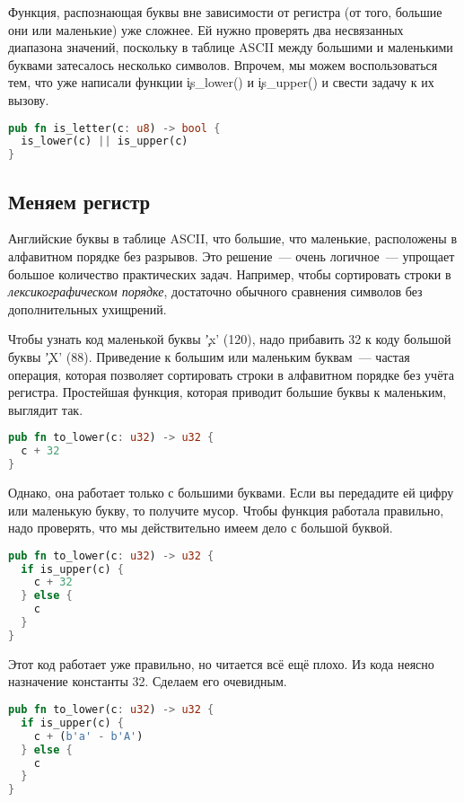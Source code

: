 Функция, распознающая буквы вне зависимости от регистра (от того, большие они или маленькие) уже сложнее.
Ей нужно проверять два несвязанных диапазона значений, поскольку в таблице ASCII между большими и маленькими буквами затесалось несколько символов.
Впрочем, мы можем воспользоваться тем, что уже написали функции \c{is\_lower()} и \c{is\_upper()} и свести задачу к их вызову.

\begin{lstlisting}[language=Rust]
pub fn is_letter(c: u8) -> bool {
  is_lower(c) || is_upper(c)
}
\end{lstlisting}

\subsection{Меняем регистр}

Английские буквы в таблице ASCII, что большие, что маленькие, расположены в алфавитном порядке без разрывов.
Это решение~--- очень логичное~--- упрощает большое количество практических задач.
Например, чтобы сортировать строки в {\em лексикографическом порядке}, достаточно обычного сравнения символов без дополнительных ухищрений.

Чтобы узнать код маленькой буквы \c{'x'} (120), надо прибавить 32 к коду большой буквы \c{'X'} (88).
Приведение к большим или маленьким буквам~--- частая операция, которая позволяет сортировать строки в алфавитном порядке без учёта регистра.
Простейшая функция, которая приводит большие буквы к маленьким, выглядит так.

\begin{lstlisting}[language=Rust]
pub fn to_lower(c: u32) -> u32 {
  c + 32
}
\end{lstlisting}

Однако, она работает только с большими буквами. Если вы передадите ей цифру или маленькую букву, то получите мусор.
Чтобы функция работала правильно, надо проверять, что мы действительно имеем дело с большой буквой.

\begin{lstlisting}[language=Rust]
pub fn to_lower(c: u32) -> u32 {
  if is_upper(c) {
    c + 32
  } else {
    c
  }
}
\end{lstlisting}

Этот код работает уже правильно, но читается всё ещё плохо.
Из кода неясно назначение константы 32.
Сделаем его очевидным.

\begin{lstlisting}[language=Rust]
pub fn to_lower(c: u32) -> u32 {
  if is_upper(c) {
    c + (b'a' - b'A')
  } else {
    c
  }
}
\end{lstlisting}

